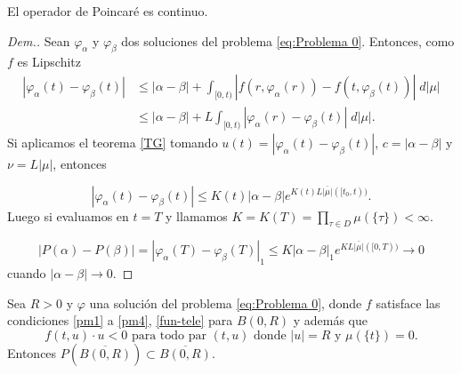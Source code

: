  
 \begin{lem}
    El operador de Poincaré es continuo.\label{opr continuo}
\end{lem}
\begin{proof}[Dem.]
 Sean $\varphi_\alpha$ y $\varphi_\beta$ dos soluciones del problema \eqref{eq:Problema 0}. Entonces, como $f$ es Lipschitz 
 \begin{equation*}
 \begin{split}
 	| \varphi_\alpha(t)-\varphi_\beta(t)|&\leq |\alpha-\beta |+\int_{[0,t)} |f(r,\varphi_\alpha(r)) -f(t,\varphi_\beta(t))| \; d|\mu|\\
	&\leq |\alpha-\beta|+L\int_{[0,t)} |\varphi_\alpha(r) -\varphi_\beta(t)| \; d|\mu|.
 \end{split}
\end{equation*}
 Si aplicamos el teorema \ref{TG} tomando $u(t)=|\varphi_\alpha(t)-\varphi_\beta(t)|$, $c=|\alpha-\beta|$ y  $\nu=L|\mu|$, entonces  

\begin{equation*}
|\varphi_\alpha(t)-\varphi_\beta(t)|\leq K(t) |\alpha-\beta|e^{K(t)L\bar{|\mu|}([t_0,t))}.
\end{equation*}
Luego si evaluamos en $t=T$ y llamamos  $K=K(T)=\displaystyle\prod_{\tau\in D}\mu(\{\tau\})<\infty$.
 

\begin{equation*}
 		|P(\alpha)-P(\beta)|=|\varphi_{\alpha}(T)-\varphi_{\beta}(T)|_{1}\leq K |\alpha-\beta|_{1}e^{KL\bar{|\mu|}([0,T))}\to 0
 	\end{equation*}
 cuando $|\alpha-\beta|\to 0$.
\end{proof}
 
 
 

 
 

 \begin{thm} \label{th: P}
 	Sea $R>0$ y $\varphi$ una solución del problema \ref{eq:Problema 0}, donde $f$ satisface las condiciones \ref{pm1} a \ref{pm4}, \ref{fun-tele} para $B(0,R)$  y  además que
 	\begin{equation}
 		f(t,u)\cdot u<0 \text{ para todo par } (t,u) \text{ donde }  |u| =R  \text{ y   } \mu(\{t\})=0.  \label{eq:4}
 	\end{equation}
 Entonces $P\left(  \overline{B(0,R)}\right)  \subset \overline{B(0,R)}$.
 \end{thm}
 
